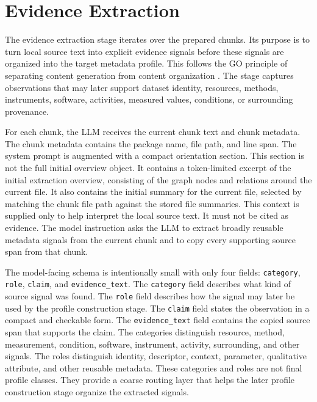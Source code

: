 \section{Evidence Extraction}
\label{sec:evidence_extraction}

The evidence extraction stage iterates over the prepared chunks.
Its purpose is to turn local source text into explicit evidence signals before these signals are organized into the target metadata profile.
This follows the \ac{GO} principle of separating content generation from content organization \cite{li2024structuredoutput}.
The stage captures observations that may later support dataset identity, resources, methods, instruments, software, activities, measured values, conditions, or surrounding provenance.

For each chunk, the \ac{LLM} receives the current chunk text and chunk metadata.
The chunk metadata contains the package name, file path, and line span.
The system prompt is augmented with a compact orientation section.
This section is not the full initial overview object.
It contains a token-limited excerpt of the initial extraction overview, consisting of the graph nodes and relations around the current file.
It also contains the initial summary for the current file, selected by matching the chunk file path against the stored file summaries.
This context is supplied only to help interpret the local source text.
It must not be cited as evidence.
The model instruction asks the \ac{LLM} to extract broadly reusable metadata signals from the current chunk and to copy every supporting source span from that chunk.

The model-facing schema is intentionally small with only four fields: \texttt{category}, \texttt{role}, \texttt{claim}, and \texttt{evidence\_\allowbreak{}text}.
The \texttt{category} field describes what kind of source signal was found.
The \texttt{role} field describes how the signal may later be used by the profile construction stage.
The \texttt{claim} field states the observation in a compact and checkable form.
The \texttt{evidence\_\allowbreak{}text} field contains the copied source span that supports the claim.
The categories distinguish resource, method, measurement, condition, software, instrument, activity, surrounding, and other signals.
The roles distinguish identity, descriptor, context, parameter, qualitative attribute, and other reusable metadata.
These categories and roles are not final profile classes.
They provide a coarse routing layer that helps the later profile construction stage organize the extracted signals.

